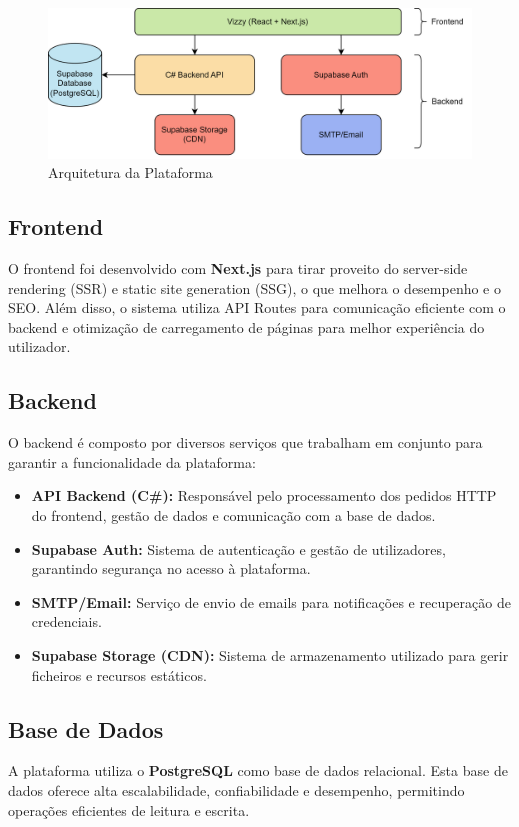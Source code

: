 \documentclass[a4paper, 12pt]{article} %
\begin{document}
\begin{figure}[ht]
	\centering
	\includegraphics[width=\textwidth]{system_architecture.png}
	\caption{Arquitetura da Plataforma}
	\label{fig:arquitetura}
\end{figure}

\subsection{Frontend}
O frontend foi desenvolvido com \textbf{Next.js} para tirar proveito do server-side rendering (SSR) e static site generation (SSG), o que melhora o desempenho e o SEO. Além disso, o sistema utiliza API Routes para comunicação eficiente com o backend e otimização de carregamento de páginas para melhor experiência do utilizador.

\subsection{Backend}
O backend é composto por diversos serviços que trabalham em conjunto para garantir a funcionalidade da plataforma:

\begin{itemize}
	\item \textbf{API Backend (C\#):} Responsável pelo processamento dos pedidos HTTP do frontend, gestão de dados e comunicação com a base de dados.
	\item \textbf{Supabase Auth:} Sistema de autenticação e gestão de utilizadores, garantindo segurança no acesso à plataforma.
	\item \textbf{SMTP/Email:} Serviço de envio de emails para notificações e recuperação de credenciais.
	\item \textbf{Supabase Storage (CDN):} Sistema de armazenamento utilizado para gerir ficheiros e recursos estáticos.
\end{itemize}

\subsection{Base de Dados}
A plataforma utiliza o \textbf{PostgreSQL} como base de dados relacional. Esta base de dados oferece alta escalabilidade, confiabilidade e desempenho, permitindo operações eficientes de leitura e escrita.
\end{document}
